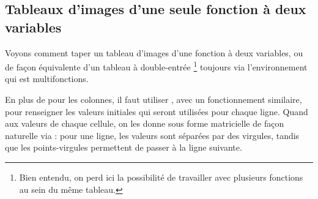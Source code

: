 \documentclass[12pt, a4paper]{article}
\begin{document}

\subsection{Tableaux d'images d'une seule fonction à deux variables}

Voyons comment taper un tableau d'images d'une fonction à deux variables, ou de façon équivalente d'un tableau à double-entrée
\footnote{
	Bien entendu, on perd ici la possibilité de travailler avec plusieurs fonctions au sein du même tableau.
}
toujours via l'environnement  qui est multifonctions.




\begin{tdocexa}
    En plus de  pour les colonnes, il faut utiliser , avec un fonctionnement similaire, pour renseigner les valeurs initiales qui seront utilisées pour chaque ligne.
    Quand aux valeurs de chaque cellule, on les donne sous forme matricielle de façon naturelle via  : pour une ligne, les valeurs sont séparées par des virgules, tandis que les points-virgules permettent de passer à la ligne suivante.

\end{tdocexa}




\begin{tdocexa}
    \leavevmode

\end{tdocexa}
\end{document}
